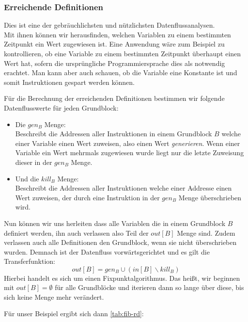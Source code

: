 \newpage
\subsubsection{Erreichende Definitionen} \label{t:rd}
Dies ist eine der gebräuchlichsten und nützlichsten Datenflussanalysen\cite[S.734]{D}.\\
Mit ihnen können wir herausfinden, welchen Variablen zu einem bestimmten
Zeitpunkt ein Wert zugewiesen ist. Eine Anwendung wäre zum Beispiel zu
kontrollieren, ob eine Variable zu einem bestimmten Zeitpunkt  überhaupt
einen Wert hat\cite[S.734]{D}, sofern die ursprüngliche Programmiersprache dies als 
notwendig erachtet. Man kann aber auch schauen, 
ob die Variable eine Konstante ist und somit Instruktionen gespart werden können.

Für die Berechnung der erreichenden Definitionen bestimmen 
wir folgende Datenflusswerte für jeden Grundblock:
\begin{itemize}
  \item Die $gen_B$ Menge:\\
    Beschreibt die Addressen aller Instruktionen in einem Grundblock $B$ welche einer Variable einen Wert zuweisen,
    also einen Wert \textit{generieren}. Wenn einer Variable ein Wert mehrmals zugewiesen wurde 
    liegt nur die letzte Zuweisung dieser in der $gen_B$ Menge.
  \item Und die $kill_B$ Menge:\\
    Beschreibt die Addressen aller Instruktionen welche einer Addresse einen Wert zuweisen, 
    der durch eine Instruktion in der $gen_B$ Menge überschrieben wird.
\end{itemize}

Nun können wir uns herleiten dass alle Variablen die in einem Grundblock $B$
definiert werden, ihn auch verlassen also Teil der $out[B]$ Menge sind.
Zudem verlassen auch alle Definitionen den Grundblock, wenn sie nicht überschrieben wurden.
Demnach ist der Datenfluss vorwärtsgerichtet und es gilt die Transferfunktion:
\[out[B]=gen_B \cup (in[B] \backslash kill_B)\]
Hierbei handelt es sich um einen Fixpunktalgorithmus. Das heißt, wir beginnen
mit $out[B]=\emptyset$ für alle Grundblöcke und iterieren dann so lange über diese,
bis sich keine Menge mehr verändert.\cite[S.739-740]{D}

Für unser Beispiel ergibt sich dann \cref{tab:fib-rd}:

